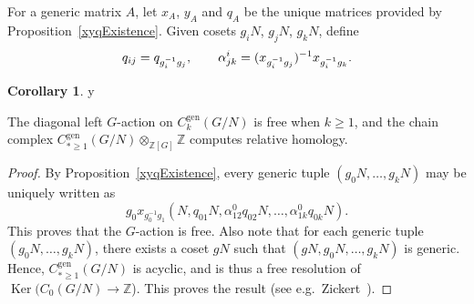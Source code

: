 \documentclass[11pt]{amsart}
\theoremstyle{definition}
\newtheorem{corollary}[theorem]{Corollary}
\numberwithin{equation}{section}
\def\printname#1{
        \if\draft y
                \smash{\makebox[0pt]{\hspace{-0.5in}
                        \raisebox{8pt}{\tt\tiny #1}}}
        \fi
}
\def\lbl#1{\label{#1}\printname{#1}}
\DeclareMathOperator{\SL}{SL}
\DeclareMathOperator{\Ker}{Ker}
\DeclareMathOperator{\gen}{gen}
\newcommand{\C}{\mathbb C}
\newcommand{\Z}{\mathbb Z}
\begin{document}

For a generic matrix $A$, let $x_A$, $y_A$ and $q_A$ be the unique matrices provided by Proposition~\ref{xyqExistence}. Given cosets $g_{i}N$, $g_jN$, $g_kN$, define
\begin{equation}
\lbl{qandalpha}
q_{ij}=q_{g_i^{-1}g_j},\qquad \alpha^i_{jk}=(x_{g_i^{-1}g_j})^{-1}x_{g_i^{-1}g_k}.
\end{equation}

\begin{corollary}
\lbl{freeaction}
The diagonal left $G$-action on $C_k^{\gen}(G/N)$ is free when $k\geq 1$, and the chain complex $C_{*\geq 1}^{\gen}(G/N)\otimes_{\Z[G]}\Z$ computes relative homology.
\end{corollary}

\begin{proof}
By Proposition~\ref{xyqExistence}, every generic tuple $(g_0N,\dots,g_kN)$ may be uniquely written as
\begin{equation}
g_0x_{g_0^{-1}g_1}(N,q_{01}N,\alpha^0_{12}q_{02}N,\dots,\alpha^0_{1k}q_{0k}N).
\end{equation}
This proves that the $G$-action is free. Also note that for each generic tuple $(g_0N,\dots,g_kN)$, there exists a coset $gN$ such that $(gN,g_0N,\dots,g_kN)$ is generic. Hence, $C_{*\geq 1}^{\gen}(G/N)$ is acyclic, and is thus a free resolution of $\Ker(C_0(G/N)\to\Z$). This proves the result (see e.g.~Zickert~\cite[Theorem~2.1]{ZickertDuke}).
\end{proof}
\end{document}
